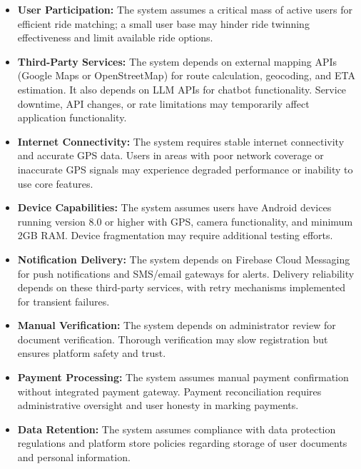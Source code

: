 \begin{itemize}
    \item \textbf{User Participation:} The system assumes a critical mass of active users for efficient ride matching; a small user base may hinder ride twinning effectiveness and limit available ride options.
    
    \item \textbf{Third-Party Services:} The system depends on external mapping APIs (Google Maps or OpenStreetMap) for route calculation, geocoding, and ETA estimation. It also depends on LLM APIs for chatbot functionality. Service downtime, API changes, or rate limitations may temporarily affect application functionality.
    
    \item \textbf{Internet Connectivity:} The system requires stable internet connectivity and accurate GPS data. Users in areas with poor network coverage or inaccurate GPS signals may experience degraded performance or inability to use core features.
    
    \item \textbf{Device Capabilities:} The system assumes users have Android devices running version 8.0 or higher with GPS, camera functionality, and minimum 2GB RAM. Device fragmentation may require additional testing efforts.
    
    \item \textbf{Notification Delivery:} The system depends on Firebase Cloud Messaging for push notifications and SMS/email gateways for alerts. Delivery reliability depends on these third-party services, with retry mechanisms implemented for transient failures.
    
    \item \textbf{Manual Verification:} The system depends on administrator review for document verification. Thorough verification may slow registration but ensures platform safety and trust.
    
    \item \textbf{Payment Processing:} The system assumes manual payment confirmation without integrated payment gateway. Payment reconciliation requires administrative oversight and user honesty in marking payments.
    
    \item \textbf{Data Retention:} The system assumes compliance with data protection regulations and platform store policies regarding storage of user documents and personal information.
\end{itemize}

